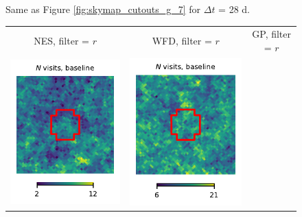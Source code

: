 \documentclass[preprintm,linenumbers]{aastex631}
\begin{document}
\begin{figure}
\begin{tabular}{  c c c}
			\end{tabular}
			\caption{
   Same as Figure \ref{fig:skymap_cutouts_g_7} for $\Delta t$ = 28 d. 
    }
	\label{fig:skymap_cutouts_g_28}
		\end{figure}

  
  	\begin{figure}
			\centering
			\begin{tabular}{  c c c}
                 NES, filter = $r$ & WFD, filter = $r$ & GP, filter = $r$ \\
				\includegraphics{results/skymaps_cutout/skymaps_cutout_first_year_one_snap_v4_0_10yrs_db_noDD_noTwi_nside-256_CountMetric_r_NES_noDD_noTwi.pdf} &
				\includegraphics{results/skymaps_cutout/skymaps_cutout_first_year_one_snap_v4_0_10yrs_db_noDD_noTwi_nside-256_CountMetric_r_WFD_noDD_noTwi.pdf} &

\end{tabular}
\end{figure}
\end{document}
